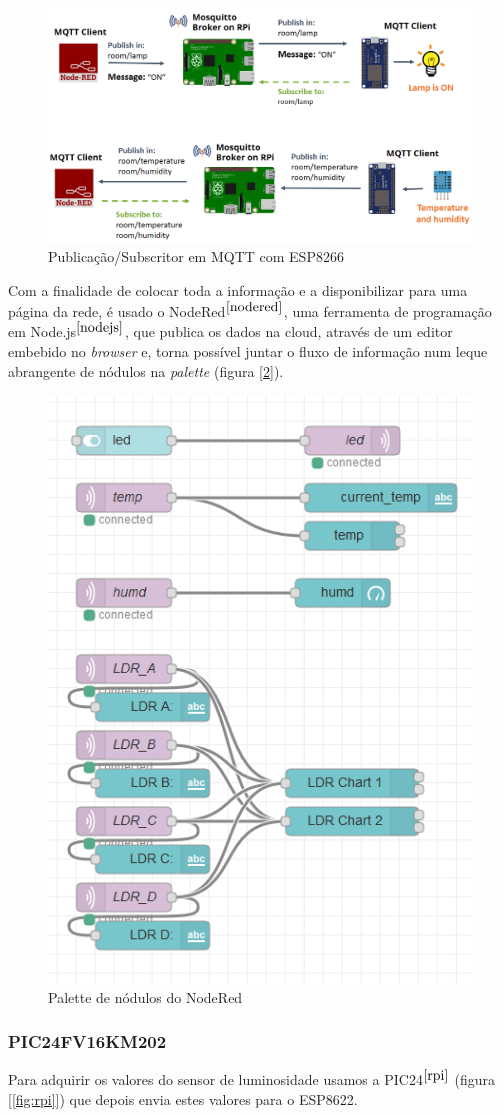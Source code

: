 \documentclass[12pt]{article}
\begin{document}
\begin{figure}[H]
        \centering
        \includegraphics[width=0.8\linewidth]{imgs/MQTT-ESP8266-publish-and-subscribe-Node-RED.png}
        \caption{Publicação/Subscritor em MQTT com ESP8266}
        \label{fig:mqttesp}
\end{figure}

Com a finalidade de colocar toda a informação e a disponibilizar para uma página da rede, é usado o NodeRed$^{\cite{nodered}}$, uma ferramenta de programação em Node.js$^{\cite{nodejs}}$, que publica os dados na cloud, através de um editor embebido no \textit{browser} e, torna possível juntar o fluxo de informação num leque abrangente de nódulos na \textit{palette} (figura [\ref{fig:noderedpal}]).

\begin{figure}[H]
        \centering
        \includegraphics[width=0.4\linewidth]{imgs/SERVER_V04_NR_Code.png}
        \caption{Palette de nódulos do NodeRed}
        \label{fig:noderedpal}
\end{figure}

\subsubsection{PIC24FV16KM202}
\par Para adquirir os valores do sensor de luminosidade usamos a  PIC24$^{\cite{rpi}}$ (figura [\ref{fig:rpi}]) que depois envia estes valores para o ESP8622.\\
\end{document}

